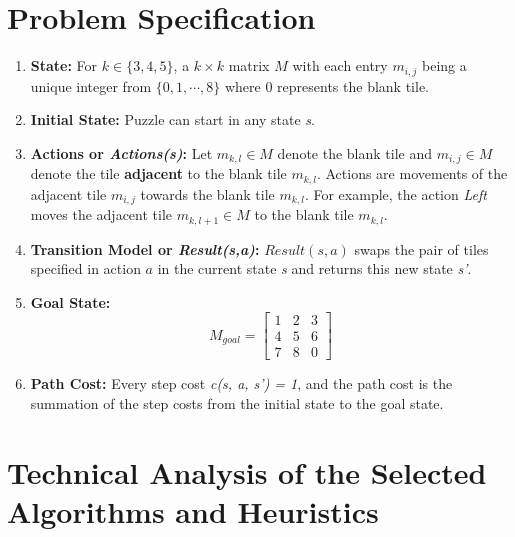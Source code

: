 \documentclass[runningheads]{llncs}
\begin{document}
\section{Problem Specification}
\begin{enumerate}
    \item \textbf{State:} For \( k \in \{3, 4, 5\} \),  a \( k \times k \) matrix \( M \) with each entry \( m_{i, j} \) being a unique integer from \( \{0, 1, \cdots, 8 \} \) where 0 represents the blank tile.
    \item \textbf{Initial State:} Puzzle can start in any state \textit{s}.
    \item \textbf{Actions or \textit{Actions(s)}:} Let \( m_{k, l} \in M \) denote the blank tile and \( m_{i, j} \in M \) denote the tile \textbf{adjacent} to the blank tile \( m_{k, l} \).
    Actions are movements of the adjacent tile \( m_{i, j} \) towards the blank tile \( m_{k, l} \). For example, the action \textit{Left} moves the adjacent tile \( m_{k, l+1} \in M \) to the blank tile \( m_{k, l} \).
    \item \textbf{Transition Model or \textit{Result(s,a)}:} \( Result(s, a) \) swaps the pair of tiles specified in action \( a \) in the current state \textit{s} and returns this new state \textit{s'}.
    \item \textbf{Goal State:}
    \[
    M_{goal}= \begin{bmatrix}
        1 & 2 & 3 \\
        4 & 5 & 6 \\
        7 & 8 & 0
        \end{bmatrix}
    \]
    \item \textbf{Path Cost:} Every step cost \textit{c(s, a, s') = 1}, and the path cost is the summation of the step costs from the initial state to the goal state.
\end{enumerate}

\section{Technical Analysis of the Selected Algorithms and Heuristics}
\end{document}
